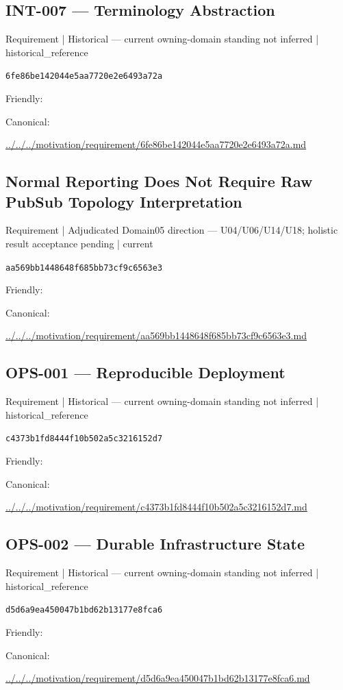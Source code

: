 \documentclass[10pt,a4paper]{article}
\begin{document}
\subsection*{INT-007 — Terminology Abstraction}
{\small Requirement | Historical — current owning-domain standing not inferred | historical\_reference}\par
\texttt{6fe86be142044e5aa7720e2e6493a72a}\par
Friendly: \par
Canonical: \par
{\footnotesize\url{../../../motivation/requirement/6fe86be142044e5aa7720e2e6493a72a.md}}\par
\subsection*{Normal Reporting Does Not Require Raw PubSub Topology Interpretation}
{\small Requirement | Adjudicated Domain05 direction — U04/U06/U14/U18; holistic result acceptance pending | current}\par
\texttt{aa569bb1448648f685bb73cf9c6563e3}\par
Friendly: \par
Canonical: \par
{\footnotesize\url{../../../motivation/requirement/aa569bb1448648f685bb73cf9c6563e3.md}}\par
\subsection*{OPS-001 — Reproducible Deployment}
{\small Requirement | Historical — current owning-domain standing not inferred | historical\_reference}\par
\texttt{c4373b1fd8444f10b502a5c3216152d7}\par
Friendly: \par
Canonical: \par
{\footnotesize\url{../../../motivation/requirement/c4373b1fd8444f10b502a5c3216152d7.md}}\par
\subsection*{OPS-002 — Durable Infrastructure State}
{\small Requirement | Historical — current owning-domain standing not inferred | historical\_reference}\par
\texttt{d5d6a9ea450047b1bd62b13177e8fca6}\par
Friendly: \par
Canonical: \par
{\footnotesize\url{../../../motivation/requirement/d5d6a9ea450047b1bd62b13177e8fca6.md}}\par
\end{document}
